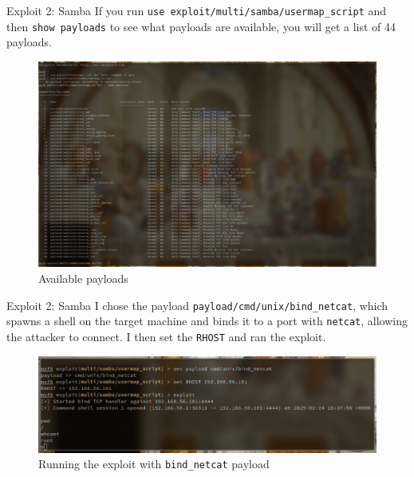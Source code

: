 \documentclass[]{beamer}
\begin{document}
\begin{frame}{Exploit 2: Samba}
    If you run \texttt{use exploit/multi/samba/usermap\_script} and then \texttt{show payloads} to see what payloads are available, 
    you will get a list of 44 payloads.

\begin{figure}[H]
    \centering
    \includegraphics[width=\textwidth]{./images/sambapayloads.png}
    \caption{Available payloads}
\end{figure}

\end{frame}

\begin{frame}{Exploit 2: Samba}
I chose the payload \texttt{payload/cmd/unix/bind\_netcat}, which spawns a shell on the target machine and binds it to a port with \texttt{netcat}, allowing the attacker to connect.
I then set the \texttt{RHOST} and ran the exploit.

\begin{figure}[H]
    \centering
    \includegraphics[width=\textwidth]{./images/sambaexploit.png}
    \caption{Running the exploit with \texttt{bind\_netcat} payload}
\end{figure}
\end{frame}
\end{document}
